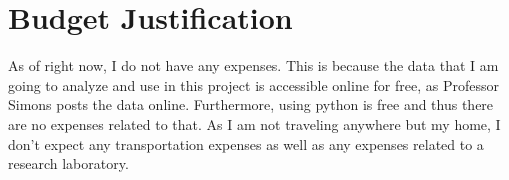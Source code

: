 \documentclass[12pt]{article}
\begin{document}
	\section{Budget Justification}
	As of right now, I do not have any expenses. This is because the data that I am going to analyze and use in this project is accessible online for free, as Professor Simons posts the data online. Furthermore, using python is free and thus there are no expenses related to that. As I am not traveling anywhere but my home, I don’t expect any transportation expenses as well as any expenses related to a research laboratory.  
	
	\small
	\renewcommand{\bibsep}{0em}
	
	\renewcommand{\bibname}{References}
	
	
\end{document}
